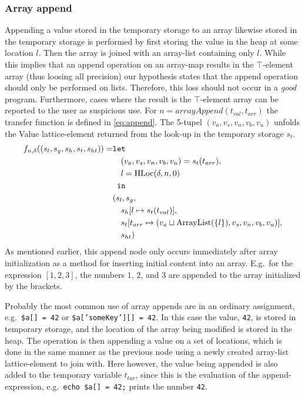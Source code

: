 \subsubsection{Array append}
Appending a value stored in the temporary storage to an array likewise stored in the temporary storage is performed by first storing the value in the heap at some location $l$. Then the array is joined with an array-list containing only $l$. While this implies that an append operation on an array-map results in the $\top$-element array (thus loosing all precision) our hypothesis states that the append operation should only be performed on lists. Therefore, this loss should not occur in a \emph{good} program. Furthermore, cases where the result is the $\top$-element array can be reported to the user as suspicious use. For $n = \mathit{arrayAppend}(t_{val},t_{arr})$ the transfer function is defined in \ref{eq:append}. The 5-tupel $(v_a, v_s, v_n, v_b, v_u)$ unfolds the Value lattice-element returned from the look-up in the temporary storage $s_t$.
\begin{align}
f_{n,\delta}((s_l, s_g, s_h, s_t, s_{ht})) = & \texttt{let } \notag\\
                                    & \quad (v_a,v_s,v_n,v_b,v_u) = s_t(t_{arr}), \notag\\
                                    & \quad l = \text{HLoc}(\delta, n, 0)\notag\\
                                    & \texttt{ in } \notag\\
                                    &(s_l,s_g,\notag\\
                                    &\quad s_h[l\mapsto s_t(t_{val})], \notag\\
                                    &\quad s_t[t_{arr} \mapsto (v_a \sqcup \text{ArrayList}(\{l\}),v_s, v_n, v_b, v_u)],\notag\\
                                    &\quad s_{ht}) \label{eq:append}
\end{align}
As mentioned earlier, this append node only occurs immediately after array initialization as a method for inserting initial content into an array. E.g.\ for the expression $[1,2,3]$, the numbers $1$, $2$, and $3$ are appended to the array initialized by the brackets.

Probably the most common use of array appends are in an ordinary assignment, e.g.\ \texttt{\$a[] = 42} or \texttt{\$a['someKey'][] = 42}. In this case the value, \texttt{42}, is stored in temporary storage, and the location of the array being modified is stored in the heap. The operation is then appending a value on a set of locations, which is done in the same manner as the previous node using a newly created array-list lattice-element to join with. Here however, the value being appended is also added to the temporary variable $t_{tar}$, since this is the evaluation of the append-expression, e.g.\ \texttt{echo \$a[] = 42;} prints the number \texttt{42}. 

